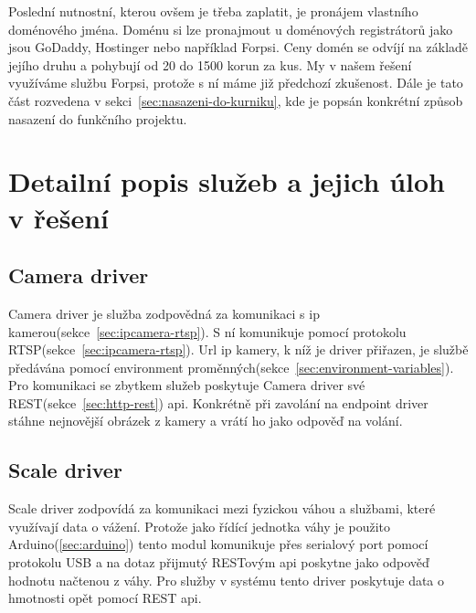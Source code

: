 \newline
Poslední nutnostní, kterou ovšem je třeba zaplatit, je pronájem vlastního doménového jména.
Doménu si lze pronajmout u doménových registrátorů jako jsou GoDaddy, Hostinger nebo například Forpsi.
Ceny domén se odvíjí na základě jejího druhu a pohybují od 20 do 1500 korun za kus.
My v našem řešení využíváme službu Forpsi, protože s ní máme již předchozí zkušenost.
\newline
Dále je tato část rozvedena v sekci~\ref{sec:nasazeni-do-kurniku}, kde je popsán konkrétní způsob nasazení do funkčního projektu.

\section{Detailní popis služeb a jejich úloh v řešení}

\subsection{Camera driver}
Camera driver je služba zodpovědná za komunikaci s ip kamerou(sekce~\ref{sec:ipcamera-rtsp}).\newline
S ní komunikuje pomocí protokolu RTSP(sekce~\ref{sec:ipcamera-rtsp}).
Url ip kamery, k níž je driver přiřazen, je službě předávána pomocí environment proměnných(sekce~\ref{sec:environment-variables}).
Pro komunikaci se zbytkem služeb poskytuje Camera driver své REST(sekce~\ref{sec:http-rest}) api.
Konkrétně při zavolání na endpoint driver stáhne nejnovější obrázek z kamery a vrátí ho jako odpověď na volání.

\subsection{Scale driver}
Scale driver zodpovídá za komunikaci mezi fyzickou váhou a službami, které využívají data o vážení.\newline
Protože jako řídící jednotka váhy je použito Arduino(\ref{sec:arduino}) tento modul komunikuje přes serialový port pomocí protokolu USB a na dotaz přijmutý RESTovým api poskytne jako odpověď hodnotu načtenou z váhy.
Pro služby v systému tento driver poskytuje data o hmotnosti opět pomocí REST api.

